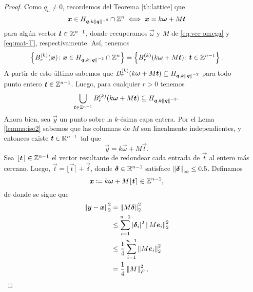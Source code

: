 \begin{proof}
	Como $q_n \neq 0$, recordemos del Teorema \eqref{th:lattice} que
	\begin{equation*}
		\boldsymbol{x} \in H_{\boldsymbol{q}, k\left\lVert \boldsymbol{q} \right\rVert^{-2}} \cap \mathbb{Z}^n \iff \boldsymbol{x} = k\boldsymbol{\omega} + M\boldsymbol{t}
	\end{equation*}
	para algún vector $\boldsymbol{t} \in \mathbb{Z}^{n-1}$, donde recuperamos $\vec{\omega}$ y $M$ de
	\eqref{eq:vec-omega} y \eqref{eq:mat-T}, respectivamente. Así, tenemos
	\begin{equation*}
		\left\lbrace B_r^{(k)}(\boldsymbol{x}) \colon \boldsymbol{x} \in H_{\boldsymbol{q}, k\left\lVert \boldsymbol{q} \right\rVert^{-2}} \cap
			\mathbb{Z}^n \right\rbrace
			=
		\left\lbrace B_r^{(k)}(k\boldsymbol{\omega} + M\boldsymbol{t}) \colon \boldsymbol{t} \in \mathbb{Z}^{n-1} \right\rbrace.
	\end{equation*}
	A partir de esto último sabemos que $B_r^{(k)}(k\boldsymbol{\omega} + M\boldsymbol{t}) \subseteq H_{\boldsymbol{q},
	k\left\lVert \boldsymbol{q} \right\rVert^{-2}}$ para todo punto entero $\boldsymbol{t} \in \mathbb{Z}^{n-1}$. Luego, para cualquier $r >
	0$ tenemos
	\begin{equation}
		\label{eq:ball-cover:1}
		\bigcup_{\boldsymbol{t} \in \mathbb{Z}^{n-1}}B_r^{(k)}(k\boldsymbol{\omega} + M\boldsymbol{t}) \subseteq
		H_{\boldsymbol{q}, k\left\lVert \boldsymbol{q} \right\rVert^{-2}}.
	\end{equation}
	Ahora bien, sea $\vec{y}$ un punto sobre la $k$-ésima capa entera. Por el Lema \ref{lemma:iso2}
	sabemos que las columnas de $M$ son linealmente independientes, y entonces existe $\boldsymbol{t} \in
	\mathbb{R}^{n-1}$ tal que
	\begin{equation*}
		\vec{y} = k\vec{\omega} + M\vec{t}.
	\end{equation*}
	Sea $\lfloor \boldsymbol{t} \rceil \in \mathbb{Z}^{n-1}$ el vector resultante de redondear cada entrada de
	$\vec{t}$ al entero más cercano. Luego, $\vec{t} = \lfloor \vec{t} \rceil + \vec{\delta}$,
	donde $\boldsymbol{\delta} \in \mathbb{R}^{n-1}$ satisface $\left\lVert \boldsymbol{\delta} \right\rVert_{\infty} \leq 0.5$. Definamos
	\begin{equation*}
		\boldsymbol{x} \coloneq k\boldsymbol{\omega} + M\lfloor \boldsymbol{t} \rceil \in \mathbb{Z}^{n-1},
	\end{equation*}
	de donde se sigue que
	\begin{align}
		\norm{\vec{y} - \vec{x}}_2^{2} 
		&= \norm{M\vec{\delta}}_{2}^{2} \nonumber \\
		&\leq \sum_{i=1}^{n-1}|\vec{\delta}_i|^2 \norm{M\vec{e}_i}_2^{2} \nonumber \\
		&\leq \frac{1}{4}\sum_{i=1}^{n-1} \norm{M\vec{e}_i}_2^{2} \label{eq:alt-M-bound} \\
		&= \frac{1}{4}\norm{M}_F^2, \nonumber

\end{align}
\end{proof}
